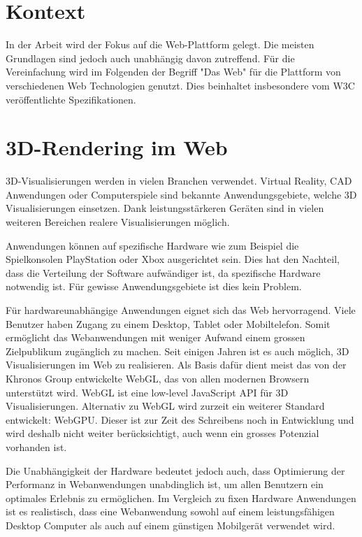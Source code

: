 \section{Kontext}
In der Arbeit wird der Fokus auf die Web-Plattform gelegt. Die meisten Grundlagen sind jedoch auch unabhängig davon zutreffend.
Für die Vereinfachung wird im Folgenden der Begriff "Das Web" für die Plattform von verschiedenen Web Technologien genutzt. Dies beinhaltet insbesondere vom W3C veröffentlichte Spezifikationen.

\section{3D-Rendering im Web}
3D-Visualisierungen werden in vielen Branchen verwendet.
Virtual Reality, CAD Anwendungen oder Computerspiele sind bekannte Anwendungsgebiete, welche 3D Visualisierungen einsetzen.
Dank leistungsstärkeren Geräten sind in vielen weiteren Bereichen realere Visualisierungen möglich.

Anwendungen können auf spezifische Hardware wie zum Beispiel die Spielkonsolen PlayStation oder Xbox ausgerichtet sein. Dies hat den Nachteil, dass die Verteilung der Software aufwändiger ist, da spezifische Hardware notwendig ist. Für gewisse Anwendungsgebiete ist dies kein Problem.

Für hardwareunabhängige Anwendungen eignet sich das Web hervorragend. Viele Benutzer haben Zugang zu einem Desktop, Tablet oder Mobiltelefon.
Somit ermöglicht das Webanwendungen mit weniger Aufwand einem grossen Zielpublikum zugänglich zu machen.
Seit einigen Jahren ist es auch möglich, 3D Visualisierungen im Web zu realisieren.
Als Basis dafür dient meist das von der Khronos Group entwickelte WebGL, das von allen modernen Browsern unterstützt wird. WebGL ist eine low-level JavaScript API für 3D Visualisierungen. \cite{webGl1Spec}
Alternativ zu WebGL wird zurzeit ein weiterer Standard entwickelt: WebGPU. Dieser ist zur Zeit des Schreibens noch in Entwicklung und wird deshalb nicht weiter berücksichtigt, auch wenn ein grosses Potenzial vorhanden ist. \cite{webGPUCharter}

Die Unabhängigkeit der Hardware bedeutet jedoch auch, dass Optimierung der Performanz in Webanwendungen unabdinglich ist, um allen Benutzern ein optimales Erlebnis zu ermöglichen.
Im Vergleich zu fixen Hardware Anwendungen ist es realistisch, dass eine Webanwendung sowohl auf einem leistungsfähigen Desktop Computer als auch auf einem günstigen Mobilgerät verwendet wird.

